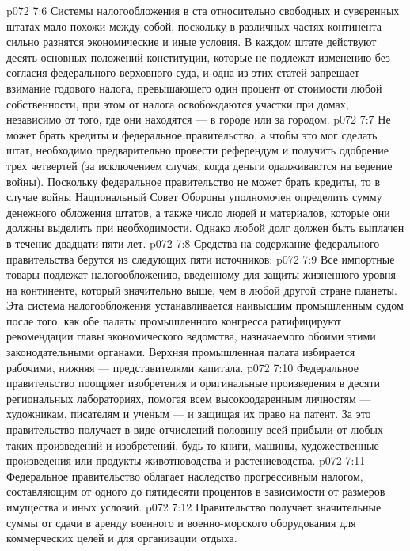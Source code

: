 \vs p072 7:6 \pc Системы налогообложения в ста относительно свободных и суверенных штатах мало похожи между собой, поскольку в различных частях континента сильно разнятся экономические и иные условия. В каждом штате действуют десять основных положений конституции, которые не подлежат изменению без согласия федерального верховного суда, и одна из этих статей запрещает взимание годового налога, превышающего один процент от стоимости любой собственности, при этом от налога освобождаются участки при домах, независимо от того, где они находятся --- в городе или за городом.
\vs p072 7:7 Не может брать кредиты и федеральное правительство, а чтобы это мог сделать штат, необходимо предварительно провести референдум и получить одобрение трех четвертей (за исключением случая, когда деньги одалживаются на ведение войны). Поскольку федеральное правительство не может брать кредиты, то в случае войны Национальный Совет Обороны уполномочен определить сумму денежного обложения штатов, а также число людей и материалов, которые они должны выделить при необходимости. Однако любой долг должен быть выплачен в течение двадцати пяти лет.
\vs p072 7:8 \pc Средства на содержание федерального правительства берутся из следующих пяти источников:
\vs p072 7:9 \bibnobreakspace {} Все импортные товары подлежат налогообложению, введенному для защиты жизненного уровня на континенте, который значительно выше, чем в любой другой стране планеты. Эта система налогообложения устанавливается наивысшим промышленным судом после того, как обе палаты промышленного конгресса ратифицируют рекомендации главы экономического ведомства, назначаемого обоими этими законодательными органами. Верхняя промышленная палата избирается рабочими, нижняя --- представителями капитала.
\vs p072 7:10 \bibnobreakspace {} Федеральное правительство поощряет изобретения и оригинальные произведения в десяти региональных лабораториях, помогая всем высокоодаренным личностям --- художникам, писателям и ученым --- и защищая их право на патент. За это правительство получает в виде отчислений половину всей прибыли от любых таких произведений и изобретений, будь то книги, машины, художественные произведения или продукты животноводства и растениеводства.
\vs p072 7:11 \bibnobreakspace {} Федеральное правительство облагает наследство прогрессивным налогом, составляющим от одного до пятидесяти процентов в зависимости от размеров имущества и иных условий.
\vs p072 7:12 \bibnobreakspace {} Правительство получает значительные суммы от сдачи в аренду военного и военно\hyp{}морского оборудования для коммерческих целей и для организации отдыха.
